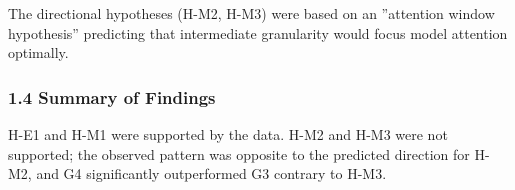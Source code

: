 The directional hypotheses (H-M2, H-M3) were based on an ''attention window hypothesis'' predicting that intermediate granularity would focus model attention optimally.

\subsubsection{1.4 Summary of Findings}

H-E1 and H-M1 were supported by the data. H-M2 and H-M3 were not supported; the observed pattern was opposite to the predicted direction for H-M2, and G4 significantly outperformed G3 contrary to H-M3.
